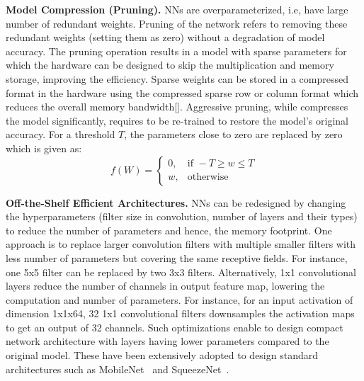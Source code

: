 \noindent\textbf{Model Compression (Pruning).} NNs are overparameterized, i.e, have large number of redundant weights.
Pruning of the network refers to removing these redundant weights (setting them as zero) without a degradation of model accuracy.
The pruning operation results in a model with sparse parameters for which the hardware can be designed to skip the multiplication and memory storage, improving the efficiency.
Sparse weights can be stored in a compressed format in the hardware using the compressed sparse row or column format which reduces the overall memory bandwidth[].
Aggressive pruning, while compresses the model significantly, requires to be re-trained to restore the model's original accuracy.
For a threshold $T$, the parameters close to zero are replaced by zero which is given as:
\[
    f(W)=
\begin{cases}
    0, & \text{if } -T \geq w \leq T\\
    w,  & \text{otherwise}
\end{cases}
\]

\noindent\textbf{Off-the-Shelf Efficient Architectures.} NNs can be redesigned by changing the hyperparameters (filter size in convolution, number of layers and their types) to reduce the number of parameters and hence, the memory footprint.
One approach is to replace larger convolution filters with multiple smaller filters with less number of parameters but covering the same receptive fields.
For instance, one 5x5 filter can be replaced by two 3x3 filters.
Alternatively, 1x1 convolutional layers reduce the number of channels in output feature map, lowering the computation and number of parameters.
For instance, for an input activation of dimension 1x1x64, 32 1x1 convolutional filters downsamples the activation maps to get an output of 32 channels.
Such optimizations enable to design compact network architecture with layers having lower parameters compared to the original model.
These have been extensively adopted to design standard architectures such as MobileNet~\cite{conf/cvpr/SandlerHZZC18} and SqueezeNet~\cite{DBLP:journals/corr/IandolaMAHDK16}.


